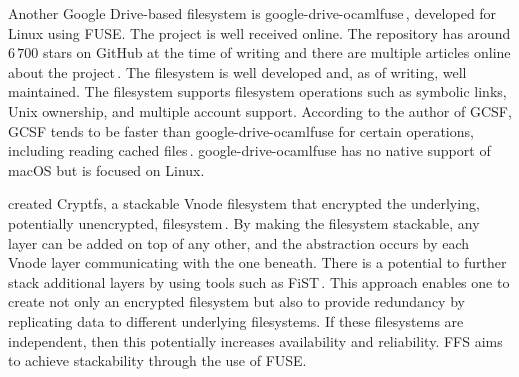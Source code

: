 Another Google \mbox{Drive-based} filesystem is \mbox{google-drive-ocamlfuse}\,\cite{stradaGoogledriveocamlfuse2022}, developed for Linux using \gls{FUSE}. The project is well received online. The repository has around $6\,700$ stars on GitHub at the time of writing and there are multiple articles online about the project\,\cite{guoanInstallGoogleDrive2021,sneddonMountYourGoogle2017,aminUseGoogleDrive2021}. The filesystem is well developed and, as of writing, well maintained. The filesystem supports filesystem operations such as symbolic links, Unix ownership, and multiple account support. According to the author of \gls{GCSF}, \gls{GCSF} tends to be faster than \mbox{google-drive-ocamlfuse} for certain operations, including reading cached files\,\cite{shubhamharnalShortGCSFTends2018,harababurelShowHNGoogle2018,}. \mbox{google-drive-ocamlfuse} has no native support of macOS but is focused on Linux. 

\citeauthor{zadokCryptfsStackableVnode1998} created Cryptfs, a stackable Vnode filesystem that encrypted the underlying, potentially unencrypted, filesystem\,\cite{zadokCryptfsStackableVnode1998}. By making the filesystem stackable, any layer can be added on top of any other, and the abstraction occurs by each Vnode layer communicating with the one beneath. There is a potential to further stack additional layers by using tools such as FiST\,\cite{FiSTStackableFile}. This approach enables one to create not only an encrypted filesystem but also to provide redundancy by replicating data to different underlying filesystems. If these filesystems are independent, then this potentially increases availability and reliability. \gls{FFS} aims to achieve stackability through the use of \gls{FUSE}. 